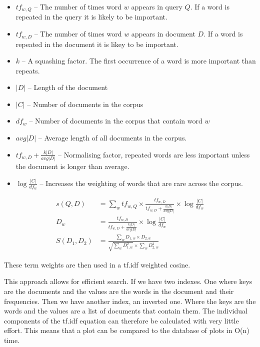 \begin{itemize}
    \item $tf_{w,Q}$ -- The number of times word $w$ appears in query $Q$.  If a word is repeated in the query it is likely to be important.
    \item $tf_{w,D}$ -- The number of times word $w$ appears in document $D$.  If a word is repeated in the document it is likey to be important.
    \item $k$ -- A squashing factor.  The first occurrence of a word is more important than repeats.
    \item $|D|$ -- Length of the document
    \item $|C|$ -- Number of documents in the corpus
    \item $df_{w}$ -- Number of documents in the corpus that contain word $w$
    \item $avg|D|$ -- Average length of all documents in the corpus.
    \item $tf_{w,D} + \frac{k|D|}{avg|D|}$ -- Normalising factor, repeated words are less important unless the document is longer than average.
    \item $\log \frac{|C|}{df_{w}}$ -- Increases the weighting of words that are rare across the corpus.
\end{itemize}

\begin{subequations}
    \begin{align}
    s(Q, D) &= \sum_{w} tf_{w,Q} \times \frac{tf_{w,D}}{tf_{w,D} + \frac{k|D|}{avg|D|}} \times \log{\frac{|C|}{df_{w}}} \label{eq:tfidf}\\
    D_{w} &= \frac{tf_{w,D}}{tf_{w,D} + \frac{k|D|}{avg|D|}} \times \log{\frac{|C|}{df_{w}}} \\
    S(D_{1}, D_{2}) &= \frac{\sum_{w} D_{1,w} \times D_{2,w}}{\sqrt{\sum_{w} D_{1,w}^2} \times \sum_{w} D_{2,w}^2}
    \end{align}
\end{subequations}

These term weights are then used in a tf.idf weighted cosine.

This approach allows for efficient search.  If we have two indexes.  One where keys are the documents and the values are the words in the document and their frequencies. Then we have another index, an inverted one.  Where the keys are the words and the values are a list of documents that contain them.  The individual components of the tf.idf equation can therefore be calculated with very little effort.  This means that a plot can be compared to the database of plots in O(n) time.

